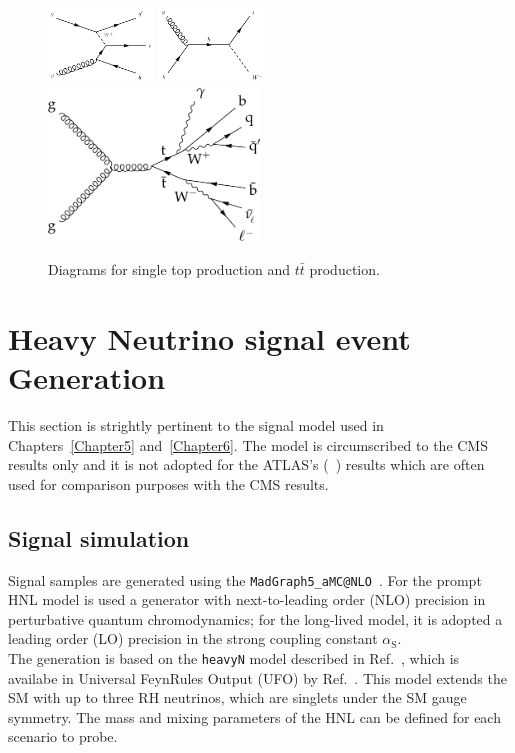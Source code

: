 \begin{figure}[h!]
\centering
 \includegraphics[width=0.25\textwidth]{Figures/c4/dia/60100003.pdf}
  \includegraphics[width=0.25\textwidth]{Figures/c4/dia/60100001.pdf}\\
  \includegraphics[width=0.5\textwidth]{Figures/c4/dia/Figure_001-a_tt.png} 
  \caption{Diagrams for single top production and $t\bar{t}$ production.~\cite{diagram}}
  \label{fig:c46}
\end{figure}



\clearpage
\section{Heavy Neutrino signal event Generation}\label{sec:c4hnl}
This section is strightly pertinent to the signal model used in
Chapters~\ref{Chapter5} and~\ref{Chapter6}. The model is circumscribed to the
CMS results only and it is not adopted for the ATLAS's
(~\cite{atlasintro2}) results which are often used for comparison
purposes with the CMS results.



\subsection{Signal simulation}\label{sec:c4hnlmodel}

Signal samples are generated using the
\texttt{MadGraph5\_aMC@NLO}~\cite{Alwall_2014}. 
For the prompt HNL
model is used a generator with next-to-leading order (NLO) precision
in perturbative quantum chromodynamics; for the long-lived model, it
is adopted a leading order (LO) precision in the strong
coupling constant $\alpha_{\mathrm{S}}$.\\
The generation is based on the \texttt{heavyN} model described in
Ref.~\cite{Atre:2009rg}, which is availabe in Universal FeynRules
Output (UFO) by Ref.~\cite{Alva:2014gxa,Degrande_2016,heavyN}.
This model extends the SM with up to three RH neutrinos,
which are singlets under the SM gauge symmetry.
The mass and mixing parameters of the HNL can be defined for each
scenario to probe.

